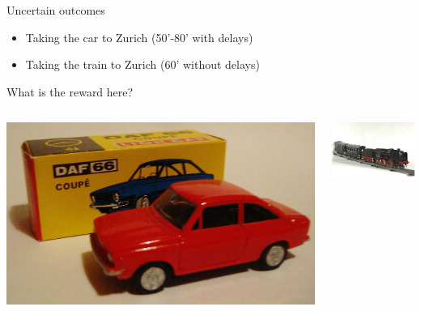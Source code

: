 \documentclass[smaller]{beamer}
\begin{document}
\begin{frame}[label={sec:orgd0373cb}]{Uncertain outcomes}
\begin{itemize}
\item\relax [A] Taking the car to Zurich (50'-80' with delays)
\item\relax [B] Taking the train to Zurich (60' without delays)
\end{itemize}
What is the reward here? 

\begin{columns}
\begin{column}{0.5\columnwidth}
\begin{center}
\includegraphics[width=.9\linewidth]{./figures/car.jpg}
\end{center}
\end{column}
\begin{column}{0.5\columnwidth}
\begin{center}
\includegraphics[width=.9\linewidth]{./figures/train.jpeg}
\end{center}
\end{column}
\end{columns}
\end{frame}
\end{document}
